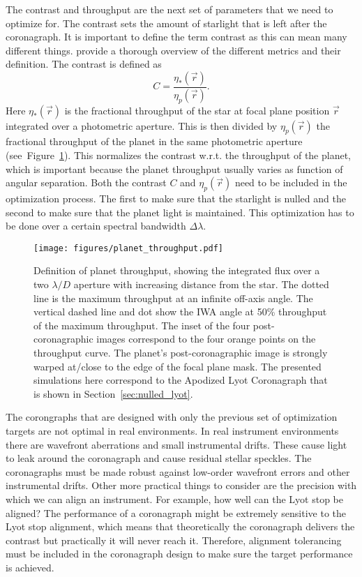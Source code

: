 \documentclass[letterpaper]{ar-1col}
\newcommand{\ld}{$\lambda/D$}
\begin{document}
The contrast and throughput are the next set of parameters that we need to optimize for.
%
The contrast sets the amount of starlight that is left after the coronagraph.
%
It is important to define the term contrast as this can mean many different things.
%
\citet{ruane2018review} provide a thorough overview of the different metrics and their definition.
%
The contrast is defined as
\begin{equation}
C = \frac{\eta_*(\vec{r})}{\eta_p(\vec{r})}.
\end{equation}
Here $\eta_*(\vec{r})$ is the fractional throughput of the star at focal plane position $\vec{r}$ integrated over a photometric aperture.
%
This is then divided by $\eta_p(\vec{r})$ the fractional throughput of the planet in the same photometric aperture (see~Figure~\ref{fig:planet_throughput}).
%
This normalizes the contrast w.r.t. the throughput of the planet, which is important because the planet throughput usually varies as function of angular separation.
%
Both the contrast $C$ and $\eta_p(\vec{r})$ need to be included in the optimization process.
%
The first to make sure that the starlight is nulled and the second to make sure that the planet light is maintained.
%
This optimization has to be done over a certain spectral bandwidth $\Delta \lambda$.



\begin{figure}[ht]
  \centering
  \texttt{[image: figures/planet\_throughput.pdf]}
  \caption{Definition of planet throughput, showing the integrated flux over a two \ld{} aperture with increasing distance from the star.
  The dotted line is the maximum throughput at an infinite off-axis angle.
  The vertical dashed line and dot show the IWA angle at 50\% throughput of the maximum throughput.
  The inset of the four post-coronagraphic images correspond to the four orange points on the throughput curve.
  The planet's post-coronagraphic image is strongly warped at/close to the edge of the focal plane mask.
  The presented simulations here correspond to the Apodized Lyot Coronagraph that is shown in Section~\ref{sec:nulled_lyot}.}
  \label{fig:planet_throughput}
\end{figure}




The corongraphs that are designed with only the previous set of optimization targets are not optimal in real environments.
%
In real instrument environments there are wavefront aberrations and small instrumental drifts.
%
These cause light to leak around the coronagraph and cause residual stellar speckles.
%
The coronagraphs must be made robust against low-order wavefront errors and other instrumental drifts.
%
Other more practical things to consider are the precision with which we can align an instrument.
%
For example, how well can the Lyot stop be aligned?
%
The performance of a coronagraph might be extremely sensitive to the Lyot stop alignment, which means that theoretically the coronagraph delivers the contrast but practically it will never reach it.
%
Therefore, alignment tolerancing must be included in the coronagraph design to make sure the target performance is achieved.
\end{document}
